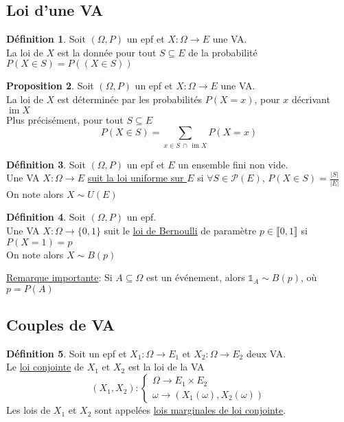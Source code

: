 \documentclass[10pt,a4paper]{article}
\theoremstyle{definition}
\newtheorem{proposition}{Proposition}[section]
\newtheorem{definition}[proposition]{Définition}
\DeclareMathOperator{\im}{im}
\begin{document}
\subsection{Loi d'une VA}
\begin{definition}
Soit $(\Omega, P)$ un epf et $X: \Omega \to E$ une VA. \\
La loi de $X$ est la donnée pour tout $S \subseteq E$ de la probabilité $P(X \in S) = P( (X \in S) )$
\end{definition}
\begin{proposition}
Soit $(\Omega, P)$ un epf et $X: \Omega \to E$ une VA. \\
La loi de $X$ est déterminée par les probabilités $P(X = x)$, pour $x$ décrivant $\im X$ \\
Plus précisément, pour tout $S \subseteq E$
\[P(X \in S) = \sum\limits_{x \in S \, \cap \, \im X} P(X = x)\]
\end{proposition}
\begin{definition}
Soit $(\Omega, P)$ un epf et $E$ un ensemble fini non vide. \\
Une VA $X: \Omega \to E$ \uline{suit la loi uniforme sur $E$} si $\forall S \in \mathcal{P}(E)$, $P(X \in S) = \frac{\left| S \right|}{\left| E \right|}$ \\
On note alors $X \sim U(E)$
\end{definition}
\begin{definition}
Soit $(\Omega, P)$ un epf. \\
Une VA $X: \Omega \to \{ 0, 1 \}$ suit le \uline{loi de Bernoulli} de paramètre $p \in \llbracket 0, 1 \rrbracket$ si $P(X = 1) = p$ \\
On note alors $X \sim B(p)$
\end{definition}
\noindent \uline{Remarque importante}: Si $A \subseteq \Omega$ est un événement, alors $\mathds{1}_A \sim B(p)$, où $p = P(A)$

\subsection{Couples de VA}
\begin{definition}
Soit un epf et $X_1: \Omega \to E_1$ et $X_2: \Omega \to E_2$ deux VA. \\
Le \uline{loi conjointe} de $X_1$ et $X_2$ est la loi de la VA
\[ (X_1, X_2) : \begin{cases}
\Omega \to E_1 \times E_2 \\
\omega \to \left(X_1(\omega), X_2(\omega) \right)
\end{cases} \]
Les lois de $X_1$ et $X_2$ sont appelées \uline{lois marginales de loi conjointe}.
\end{definition}
\end{document}

